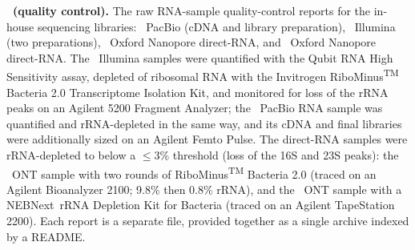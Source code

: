 \noindent\textbf{\sdqc~(quality control).}
The raw RNA-sample quality-control reports for the in-house sequencing libraries: \syn~PacBio (cDNA and library preparation), \syn~Illumina (two preparations), \syn~Oxford Nanopore direct-RNA, and \syna~Oxford Nanopore direct-RNA.
The \syn~Illumina samples were quantified with the Qubit RNA High Sensitivity assay, depleted of ribosomal RNA with the Invitrogen RiboMinus\textsuperscript{TM} Bacteria 2.0 Transcriptome Isolation Kit, and monitored for loss of the rRNA peaks on an Agilent 5200 Fragment Analyzer; the \syn~PacBio RNA sample was quantified and rRNA-depleted in the same way, and its cDNA and final libraries were additionally sized on an Agilent Femto Pulse.
The direct-RNA samples were rRNA-depleted to below a $\le$3\% threshold (loss of the 16S and 23S peaks): the \syn~ONT sample with two rounds of RiboMinus\textsuperscript{TM} Bacteria 2.0 (traced on an Agilent Bioanalyzer 2100; 9.8\% then 0.8\% rRNA), and the \syna~ONT sample with a NEBNext\textregistered~rRNA Depletion Kit for Bacteria (traced on an Agilent TapeStation 2200).
Each report is a separate file, provided together as a single archive indexed by a README.


\newpage
